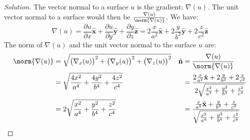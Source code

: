 \documentclass[crop=false,class=article,oneside]{standalone}
\begin{document}
        \begin{proof}[Solution]
            The vector normal to a surface $u$
            is the gradient: $\nabla(u)$.
            The unit vector normal to a surface would then be
            $\frac{\nabla(u)}{\norm{\nabla(u)}}$. We have:
            \begin{equation*}
                \nabla(u)
                =\frac{\partial u}{\partial x}\hat{\mathbf{x}}
                +\frac{\partial u}{\partial y}\hat{\mathbf{y}}
                +\frac{\partial y}{\partial z}\hat{\mathbf{z}}
                =2\frac{x}{a^2}\hat{\mathbf{x}}
                +2\frac{y}{b^2}\hat{\mathbf{y}}
                +2\frac{z}{c^2}\hat{\mathbf{z}}
            \end{equation*}
            The norm of $\nabla(u)$ and the
            unit vector normal to the surface $u$ are:
            \begin{align*}
                \norm{\nabla(u)}
                &=
                \sqrt{\big(\nabla_{x}(u)\big)^{2}
                +\big(\nabla_{y}(u)\big)^{2}
                +\big(\nabla_{z}(u)\big)^{2}}
                &\hat{\mathbf{n}}
                &=\frac{\nabla(u)}{\norm{\nabla(u)}}\\
                &=
                \sqrt{\frac{4x^{2}}{a^{4}}
                +\frac{4y^{2}}{b^{4}}+\frac{4z^{2}}{c^{4}}}
                &
                &=\frac{2\frac{x}{a^{2}}\hat{\mathbf{x}}
                +2\frac{y}{b^{2}}
                +2\frac{z}{c^{2}}}{2\sqrt{\frac{x^{2}}{a^{4}}
                +\frac{y^{2}}{b^{4}}+\frac{z^{2}}{c^{4}}}}\\
                &=
                2\sqrt{\frac{x^{2}}{a^{4}}
                +\frac{y^{2}}{b^{4}}
                +\frac{z^{2}}{c^{4}}}
                &
                &=
                \frac{\frac{x}{a^{2}}
                \hat{\mathbf{x}}+\frac{y}{b^{2}}
                +\frac{z}{c^{2}}}{\sqrt{\frac{x^{2}}{a^{4}}
                +\frac{y^{2}}{b^{4}}+\frac{z^{2}}{c^{4}}}}
            \end{align*}
        \end{proof}
\end{document}
